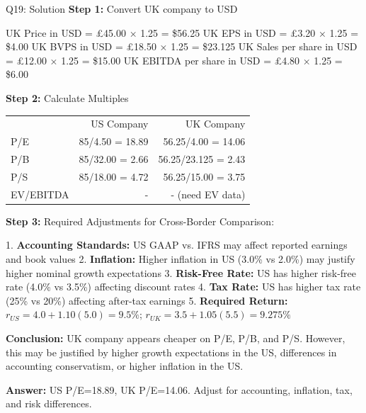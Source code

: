 \documentclass{beamer}
\renewcommand{\scriptsize}{\fontsize{6pt}{7pt}\selectfont}
\begin{document}
	\begin{frame}{Q19: Solution}
		\scriptsize
		\textbf{Step 1:} Convert UK company to USD
		
		UK Price in USD = £45.00 × 1.25 = \$56.25
		UK EPS in USD = £3.20 × 1.25 = \$4.00
		UK BVPS in USD = £18.50 × 1.25 = \$23.125
		UK Sales per share in USD = £12.00 × 1.25 = \$15.00
		UK EBITDA per share in USD = £4.80 × 1.25 = \$6.00
		
		\vspace{2pt}
		\textbf{Step 2:} Calculate Multiples
		
		\begin{tabular}{lrr}
			& US Company & UK Company \\
			P/E & 85/4.50 = 18.89 & 56.25/4.00 = 14.06 \\
			P/B & 85/32.00 = 2.66 & 56.25/23.125 = 2.43 \\
			P/S & 85/18.00 = 4.72 & 56.25/15.00 = 3.75 \\
			EV/EBITDA & - & - (need EV data) \\
		\end{tabular}
		
		\vspace{2pt}
		\textbf{Step 3:} Required Adjustments for Cross-Border Comparison:
		
		1. \textbf{Accounting Standards:} US GAAP vs. IFRS may affect reported earnings and book values
		2. \textbf{Inflation:} Higher inflation in US (3.0\% vs 2.0\%) may justify higher nominal growth expectations
		3. \textbf{Risk-Free Rate:} US has higher risk-free rate (4.0\% vs 3.5\%) affecting discount rates
		4. \textbf{Tax Rate:} US has higher tax rate (25\% vs 20\%) affecting after-tax earnings
		5. \textbf{Required Return:} $r_{US} = 4.0 + 1.10(5.0) = 9.5\%$; $r_{UK} = 3.5 + 1.05(5.5) = 9.275\%$
		
		\vspace{2pt}
		\textbf{Conclusion:} UK company appears cheaper on P/E, P/B, and P/S. However, this may be justified by higher growth expectations in the US, differences in accounting conservatism, or higher inflation in the US.
		
		\textbf{Answer:} US P/E=18.89, UK P/E=14.06. Adjust for accounting, inflation, tax, and risk differences.
	\end{frame}
	
\end{document}
